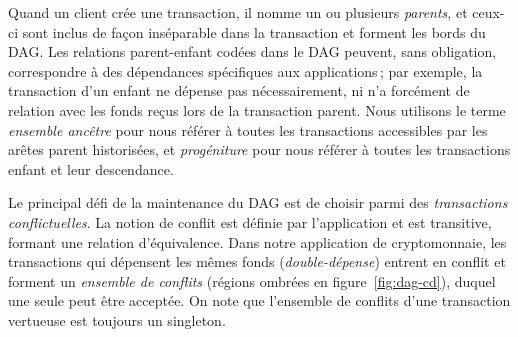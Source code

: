 Quand un client crée une transaction, il nomme un ou plusieurs \emph{parents}, et ceux-ci sont inclus de façon inséparable dans la transaction et forment les bords du DAG\@.
Les relations parent-enfant codées dans le DAG peuvent, sans obligation, correspondre à des dépendances spécifiques aux applications\,; par exemple, la transaction d'un enfant ne dépense pas nécessairement, ni n'a forcément de relation avec les fonds reçus lors de la transaction parent.
Nous utilisons le terme \emph{ensemble ancêtre} pour nous référer à toutes les transactions accessibles par les arêtes parent historisées, et \emph{progéniture} pour nous référer à toutes les transactions enfant et leur descendance.

Le principal défi de la maintenance du DAG est de choisir parmi des \emph{transactions conflictuelles}.
La notion de conflit est définie par l'application et est transitive, formant une relation d'équivalence.
Dans notre application de cryptomonnaie, les transactions qui dépensent les mêmes fonds (\emph{double-dépense}) entrent en conflit et forment un \emph{ensemble de conflits}
(régions ombrées en figure~\ref{fig:dag-cd}), duquel une seule peut être acceptée.
On note que l'ensemble de conflits d'une transaction vertueuse est toujours un singleton.
 
